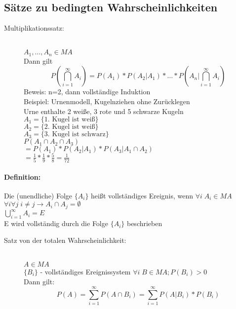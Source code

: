 \documentclass[a4paper,12pt]{scrartcl}
\begin{document}
\subsection{Sätze zu bedingten Wahrscheinlichkeiten}
\begin{description}
 \item[Multiplikationssatz:]\quad\\ $A_1,\dots,A_n \in MA$\\
 Dann gilt
 $$P(\bigcap^\infty_{i=1}A_i) = P(A_1) * P(A_2|A_1) * \dots * P(A_n|\bigcap^\infty_{i=1} A_i) $$
 Beweis: n=2, dann vollständige Induktion\\
 Beispiel: Urnenmodell, Kugelnziehen ohne Zurücklegen\\
 Urne enthalte 2 weiße, 3 rote und 5 schwarze Kugeln\\
  $A_1 = \{\text{1. Kugel ist weiß}\}$\\
  $A_2 = \{\text{2. Kugel ist weiß}\}$\\
  $A_3 = \{\text{3. Kugel ist schwarz}\}$\\
  $P(A_1\cap A_2 \cap A_3)$\\
  $= P(A_1)*P(A_2|A_1)*P(A_3|A_1\cap A_2)$\\
  $=\frac{1}{5}*\frac{1}{9}*\frac{5}{8}=\frac{1}{72}$
\end{description}
  \paragraph{Definition:} Die (unendliche) Folge $\{A_i\}$ heißt vollständiges Ereignis, wenn
  $\forall i \; A_i\in MA$\\
  $\forall i \forall j \; i\neq j \rightarrow A_i\cap A_j = \emptyset$\\
  $\bigcup^\infty_{i=1}A_i = E$\\
  E wird vollständig durch die Folge $\{A_i\}$ beschrieben
\begin{description}
 \item[Satz von der totalen Wahrscheinlichkeit:]\quad\\
 $A\in MA$\\
 $\{B_i\}$ - vollständiges Ereignissystem $\forall i\;B\in MA; P(B_i)>0 $\\
 Dann gilt: $$P(A) = \sum_{i=1}^\infty P(A\cap B_i) = \sum_{i=1}^\infty P(A|B_i) * P(B_i)$$
\end{description}
\end{document}
